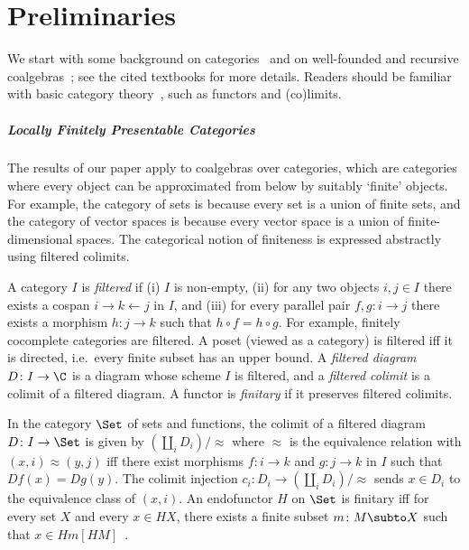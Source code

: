 \section{Preliminaries}\label{sec:prelim}
We start with some background on \lfplong categories~\cite{adamek_rosicky_1994} and on well-founded and recursive coalgebras~\cite{amm25,taylor99}; see the cited textbooks for more details. Readers should be familiar with basic category theory~\cite{mac2013categories}, such as functors and (co)limits.



\subparagraph*{Locally Finitely Presentable Categories}
The results of our paper apply to coalgebras over \lfplong categories, which are categories where every object can be approximated from below by suitably `finite' objects. For example, the category of sets is \lfplong because every set is a union of finite sets, and the category of vector spaces is \lfplong because every vector space is a  union of finite-dimensional spaces. The categorical notion of finiteness is expressed abstractly using filtered colimits.

A category $I$ is \emph{filtered} if (i) $I$ is non-empty, (ii) for any two objects $i,j\in I$ there exists a cospan $i\to k \leftarrow j$ in $I$, and (iii) for every parallel pair $f,g\colon i\to j$ there exists a morphism $h\colon j\to k$ such that $h\circ f = h\circ g$. For example, finitely cocomplete categories are filtered. A poset (viewed as a category) is filtered iff it is directed, i.e.\ every finite subset has an upper bound. A \emph{filtered diagram} $D\colon I\to \C$ is a diagram whose scheme $I$ is filtered, and a \emph{filtered colimit} is a colimit of a filtered diagram. A functor is \emph{finitary} if it preserves filtered colimits.

\begin{example}\label{ex:filtered-set}
In the category $\Set$ of sets and functions, the colimit of a filtered diagram $D\colon I\to \Set$ is given by $(\coprod_i D_i)/{\approx}$ where $\approx$ is the equivalence relation with  $(x,i)\approx (y,j)$ iff there exist morphisms $f\colon i\to k$ and $g\colon j\to k$ in $I$ such that $Df(x)=Dg(y)$. The colimit injection $c_i\colon D_i\to (\coprod_i D_i)/{\approx}$ sends $x\in D_i$ to the equivalence class of $(x,i)$. An endofunctor $H$ on $\Set$ is finitary iff for every set $X$ and every $x\in HX$, there exists a finite subset $m\colon M\subto X$ such that $x\in Hm[HM]$~\cite[Rem.\ 3.14]{amsw19}.
\end{example}

